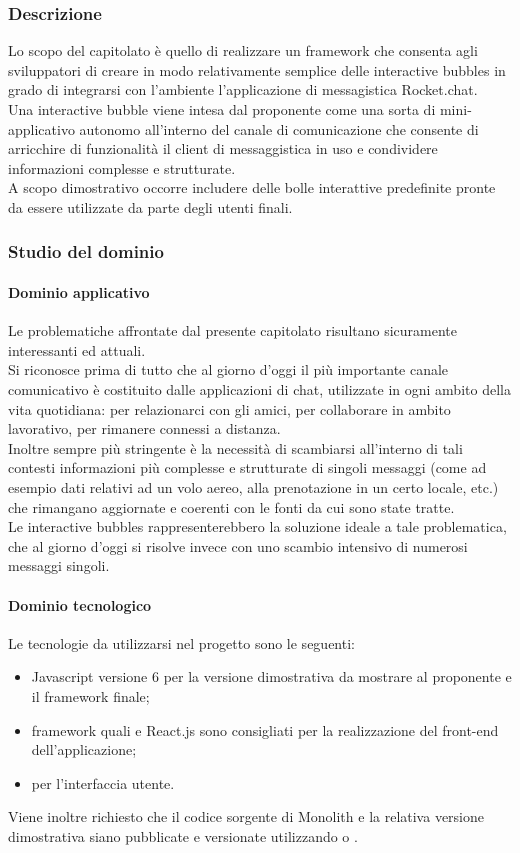 		\subsubsection{Descrizione}
		Lo scopo del capitolato è quello di realizzare un framework che consenta agli sviluppatori di creare in modo relativamente semplice delle 
		interactive bubbles in grado di integrarsi con l'ambiente l'applicazione di messagistica Rocket.chat.
		\\Una interactive bubble viene intesa dal proponente come una sorta di mini-applicativo autonomo all'interno del canale di comunicazione 
		che consente di arricchire di funzionalità il client di messaggistica in uso e condividere informazioni complesse e strutturate. 
		\\A scopo dimostrativo occorre includere delle bolle interattive predefinite pronte da essere utilizzate da parte degli utenti finali.
		
		\subsubsection{Studio del dominio}
			\paragraph{Dominio applicativo}
			Le problematiche affrontate dal presente capitolato risultano sicuramente interessanti ed attuali.
			\\Si riconosce prima di tutto che al giorno d'oggi il più importante canale comunicativo è costituito dalle applicazioni di chat, 
			utilizzate in ogni ambito della vita quotidiana: per relazionarci con gli amici, per collaborare in ambito lavorativo, per rimanere 
			connessi a distanza.
			\\Inoltre sempre più stringente è la necessità di scambiarsi all'interno di tali contesti informazioni più complesse e strutturate di singoli messaggi 
			(come ad esempio dati relativi ad un volo aereo, alla prenotazione in un certo locale, etc.) che rimangano aggiornate e coerenti con 
			le fonti da cui sono state tratte.
			\\Le interactive bubbles rappresenterebbero la soluzione ideale a tale problematica, che al giorno d'oggi si risolve invece con uno 
			scambio intensivo di numerosi messaggi singoli. 
			\paragraph{Dominio tecnologico}
			Le tecnologie da utilizzarsi nel progetto sono le seguenti:
			\begin{itemize}
				\item Javascript versione 6 per la versione dimostrativa da mostrare al proponente e il framework finale;
				\item framework quali  e React.js sono consigliati per la realizzazione del front-end dell'applicazione;
				\item {} per l'interfaccia utente.
			\end{itemize}
			Viene inoltre richiesto che il codice sorgente di Monolith e la relativa versione dimostrativa siano pubblicate e versionate utilizzando 
			 o .
